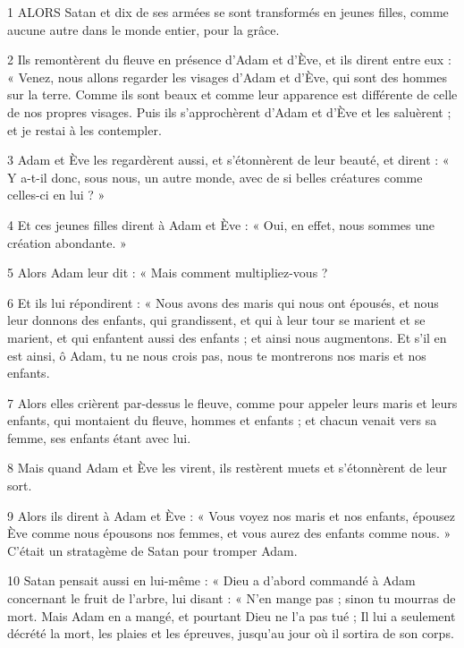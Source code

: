 \par 1 ALORS Satan et dix de ses armées se sont transformés en jeunes filles, comme aucune autre dans le monde entier, pour la grâce.

\par 2 Ils remontèrent du fleuve en présence d'Adam et d'Ève, et ils dirent entre eux : « Venez, nous allons regarder les visages d'Adam et d'Ève, qui sont des hommes sur la terre. Comme ils sont beaux et comme leur apparence est différente de celle de nos propres visages. Puis ils s'approchèrent d'Adam et d'Ève et les saluèrent ; et je restai à les contempler.

\par 3 Adam et Ève les regardèrent aussi, et s'étonnèrent de leur beauté, et dirent : « Y a-t-il donc, sous nous, un autre monde, avec de si belles créatures comme celles-ci en lui ? »

\par 4 Et ces jeunes filles dirent à Adam et Ève : « Oui, en effet, nous sommes une création abondante. »

\par 5 Alors Adam leur dit : « Mais comment multipliez-vous ?

\par 6 Et ils lui répondirent : « Nous avons des maris qui nous ont épousés, et nous leur donnons des enfants, qui grandissent, et qui à leur tour se marient et se marient, et qui enfantent aussi des enfants ; et ainsi nous augmentons. Et s’il en est ainsi, ô Adam, tu ne nous crois pas, nous te montrerons nos maris et nos enfants.

\par 7 Alors elles crièrent par-dessus le fleuve, comme pour appeler leurs maris et leurs enfants, qui montaient du fleuve, hommes et enfants ; et chacun venait vers sa femme, ses enfants étant avec lui.

\par 8 Mais quand Adam et Ève les virent, ils restèrent muets et s'étonnèrent de leur sort.

\par 9 Alors ils dirent à Adam et Ève : « Vous voyez nos maris et nos enfants, épousez Ève comme nous épousons nos femmes, et vous aurez des enfants comme nous. » C’était un stratagème de Satan pour tromper Adam.

\par 10 Satan pensait aussi en lui-même : « Dieu a d'abord commandé à Adam concernant le fruit de l'arbre, lui disant : « N'en mange pas ; sinon tu mourras de mort. Mais Adam en a mangé, et pourtant Dieu ne l'a pas tué ; Il lui a seulement décrété la mort, les plaies et les épreuves, jusqu'au jour où il sortira de son corps.

